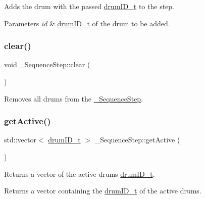 Adds the drum with the passed \hyperlink{namespacedrumpi_a3897274035c1b939a604438abe648b1b}{drum\+I\+D\+\_\+t} to the step. 
\begin{DoxyParams}{Parameters}
{\em id} & \hyperlink{namespacedrumpi_a3897274035c1b939a604438abe648b1b}{drum\+I\+D\+\_\+t} of the drum to be added. \\
\hline
\end{DoxyParams}
\mbox{\label{classdrumpi_1_1__SequenceStep_a19b7857452401f3f4522e9c0cecfdbf5}} 
\subsubsection{\texorpdfstring{clear()}{clear()}}
{\footnotesize\ttfamily void \+\_\+\+Sequence\+Step\+::clear (\begin{DoxyParamCaption}{ }\end{DoxyParamCaption})}

Removes all drums from the \hyperlink{classdrumpi_1_1__SequenceStep}{\+\_\+\+Sequence\+Step}. \mbox{\label{classdrumpi_1_1__SequenceStep_add716bdfeac7423ed9b737cade2751ff}} 
\subsubsection{\texorpdfstring{get\+Active()}{getActive()}}
{\footnotesize\ttfamily std\+::vector$<$ \hyperlink{namespacedrumpi_a3897274035c1b939a604438abe648b1b}{drum\+I\+D\+\_\+t} $>$ \+\_\+\+Sequence\+Step\+::get\+Active (\begin{DoxyParamCaption}{ }\end{DoxyParamCaption})}

Returns a vector of the active drums\textquotesingle{} \hyperlink{namespacedrumpi_a3897274035c1b939a604438abe648b1b}{drum\+I\+D\+\_\+t}. \begin{DoxyReturn}{Returns}
a vector containing the \hyperlink{namespacedrumpi_a3897274035c1b939a604438abe648b1b}{drum\+I\+D\+\_\+t} of the active drums. 
\end{DoxyReturn}
\mbox{\label{classdrumpi_1_1__SequenceStep_aea69e82bebcb219d2b85421e00841d95}} 
